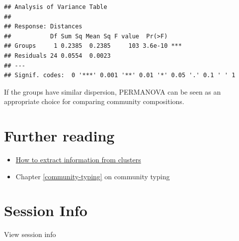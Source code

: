 \documentclass[
]{book}
\begin{document}
\begin{verbatim}
## Analysis of Variance Table
## 
## Response: Distances
##           Df Sum Sq Mean Sq F value  Pr(>F)    
## Groups     1 0.2385  0.2385     103 3.6e-10 ***
## Residuals 24 0.0554  0.0023                    
## ---
## Signif. codes:  0 '***' 0.001 '**' 0.01 '*' 0.05 '.' 0.1 ' ' 1
\end{verbatim}

If the groups have similar dispersion, PERMANOVA can be seen as an
appropriate choice for comparing community compositions.

\hypertarget{further-reading}{%
\section{Further reading}\label{further-reading}}

\begin{itemize}
\item
  \href{http://bioconductor.org/books/release/OSCA/clustering.html}{How to extract information from clusters}
\item
  Chapter \ref{community-typing} on community typing
\end{itemize}

\hypertarget{session-info-5}{%
\section*{Session Info}\label{session-info-5}}

View session info
\end{document}
